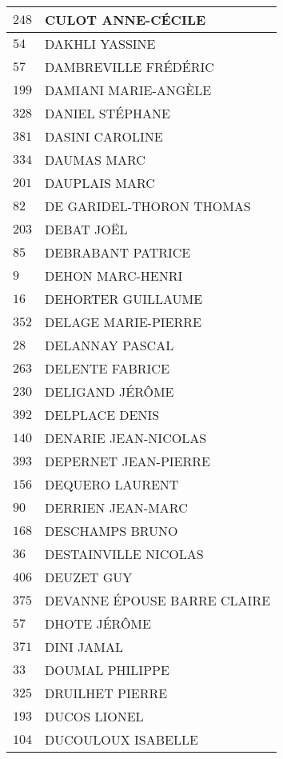 \begin{xltabular}{\linewidth}{|l|X|}
    \hline
    $248$ & CULOT ANNE-CÉCILE \\
    \hline
    $54$ & DAKHLI YASSINE \\
    \hline
    $57$ & DAMBREVILLE FRÉDÉRIC \\
    \hline
    $199$ & DAMIANI MARIE-ANGÈLE \\
    \hline
    $328$ & DANIEL STÉPHANE \\
    \hline
    $381$ & DASINI CAROLINE \\
    \hline
    $334$ & DAUMAS MARC \\
    \hline
    $201$ & DAUPLAIS MARC \\
    \hline
    $82$ & DE GARIDEL-THORON THOMAS \\
    \hline
    $203$ & DEBAT JOËL \\
    \hline
    $85$ & DEBRABANT PATRICE \\
    \hline
    $9$ & DEHON MARC-HENRI \\
    \hline
    $16$ & DEHORTER GUILLAUME \\
    \hline
    $352$ & DELAGE MARIE-PIERRE \\
    \hline
    $28$ & DELANNAY PASCAL \\
    \hline
    $263$ & DELENTE FABRICE \\
    \hline
    $230$ & DELIGAND JÉRÔME \\
    \hline
    $392$ & DELPLACE DENIS \\
    \hline
    $140$ & DENARIE JEAN-NICOLAS \\
    \hline
    $393$ & DEPERNET JEAN-PIERRE \\
    \hline
    $156$ & DEQUERO LAURENT \\
    \hline
    $90$ & DERRIEN JEAN-MARC \\
    \hline
    $168$ & DESCHAMPS BRUNO \\
    \hline
    $36$ & DESTAINVILLE NICOLAS \\
    \hline
    $406$ & DEUZET GUY \\
    \hline
    $375$ & DEVANNE ÉPOUSE BARRE CLAIRE \\
    \hline
    $57$ & DHOTE JÉRÔME \\
    \hline
    $371$ & DINI JAMAL \\
    \hline
    $33$ & DOUMAL PHILIPPE \\
    \hline
    $325$ & DRUILHET PIERRE \\
    \hline
    $193$ & DUCOS LIONEL \\
    \hline
    $104$ & DUCOULOUX ISABELLE \\

\end{xltabular}
